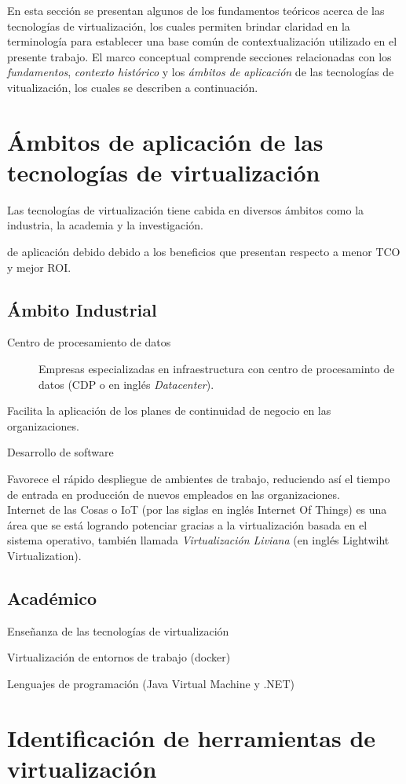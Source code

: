 En esta sección se presentan algunos de los fundamentos teóricos acerca de las tecnologías de virtualización, los cuales permiten brindar claridad en la terminología para establecer una base común de contextualización utilizado en el presente trabajo.  El marco conceptual comprende secciones relacionadas con los \textit{fundamentos}, \textit{contexto histórico} y los \textit{ámbitos de aplicación} de las tecnologías de vitualización, los cuales se describen a continuación.






\section{Ámbitos de aplicación de las tecnologías de virtualización} \label{ambitos}

Las tecnologías de virtualización tiene cabida en diversos ámbitos como la industria, la academia y la investigación. 

  de aplicación debido debido a los beneficios que presentan respecto a menor TCO y mejor ROI. 



\subsection{Ámbito Industrial}

\begin{description}
	\item[Centro de procesamiento de datos] Empresas especializadas en infraestructura con centro de procesaminto de datos (CDP o en inglés \textit{Datacenter}).
\end{description}



Facilita la aplicación de los planes de continuidad de negocio en las organizaciones. 

Desarrollo de software

Favorece el rápido despliegue de ambientes de trabajo, reduciendo así el tiempo de entrada en producción de nuevos empleados en las organizaciones. \\


Internet de las Cosas o IoT (por las siglas en inglés Internet Of Things) es una área que se está logrando potenciar gracias a la virtualización basada en el sistema operativo, también llamada \textit{Virtualización Liviana} (en inglés Lightwiht Virtualization). 



\subsection{Académico}

Enseñanza de las tecnologías de virtualización


Virtualización de entornos de trabajo (docker)


Lenguajes de programación (Java Virtual Machine y .NET)


\section{Identificación de herramientas de virtualización} \label{herramientas}



